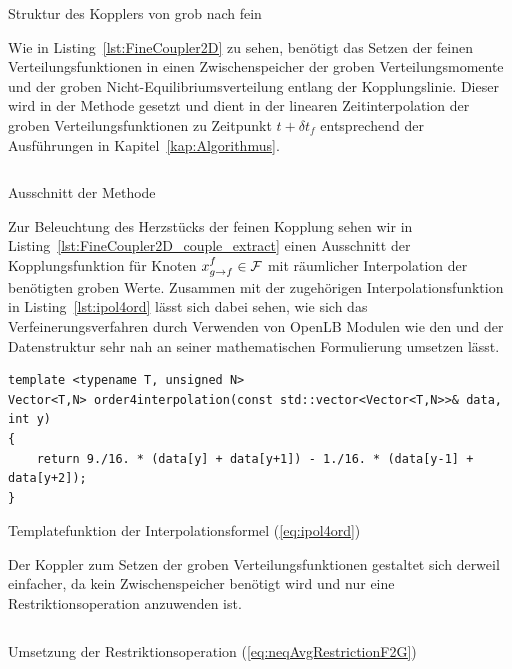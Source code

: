 \begin{listing}[H]
\inputminted{cpp}{code/fineCoupler2d.cpp}
\caption{Struktur des Kopplers von grob nach fein}
\label{lst:FineCoupler2D}
\end{listing}

Wie in Listing~\ref{lst:FineCoupler2D} zu sehen, benötigt das Setzen der feinen Verteilungsfunktionen in  einen Zwischenspeicher der groben Verteilungsmomente und der groben Nicht-Equilibriumsverteilung entlang der Kopplungslinie. Dieser wird in der Methode  gesetzt und dient in  der linearen Zeitinterpolation der groben Verteilungsfunktionen zu Zeitpunkt \(t+\delta t_f\) entsprechend der Ausführungen in Kapitel~\ref{kap:Algorithmus}.

\begin{listing}[H]
\inputminted{cpp}{code/fineCoupler2d_couple_extract.cpp}
\caption{Ausschnitt der Methode }
\label{lst:FineCoupler2D_couple_extract}
\end{listing}

Zur Beleuchtung des Herzstücks der feinen Kopplung sehen wir in Listing~\ref{lst:FineCoupler2D_couple_extract} einen Ausschnitt der Kopplungsfunktion für Knoten \(x_{g \to f}^f \in \mathcal{F}\) mit räumlicher Interpolation der benötigten groben Werte. Zusammen mit der zugehörigen Interpolationsfunktion in Listing~\ref{lst:ipol4ord} lässt sich dabei sehen, wie sich das Verfeinerungsverfahren durch Verwenden von OpenLB Modulen wie den  und der  Datenstruktur sehr nah an seiner mathematischen Formulierung umsetzen lässt.

\begin{listing}[H]
\begin{verbatim}
template <typename T, unsigned N>
Vector<T,N> order4interpolation(const std::vector<Vector<T,N>>& data, int y)
{
	return 9./16. * (data[y] + data[y+1]) - 1./16. * (data[y-1] + data[y+2]);
}
\end{verbatim}
\caption{Templatefunktion der Interpolationsformel (\ref{eq:ipol4ord})}
\label{lst:ipol4ord}
\end{listing}

Der Koppler  zum Setzen der groben Verteilungsfunktionen gestaltet sich derweil einfacher, da kein Zwischenspeicher benötigt wird und nur eine Restriktionsoperation anzuwenden ist.

\begin{listing}[H]
\inputminted{cpp}{code/computeRestrictedFneq.cpp}
\caption{Umsetzung der Restriktionsoperation (\ref{eq:neqAvgRestrictionF2G})}
\label{lst:CoarseCoupler2D_restriction}
\end{listing}

